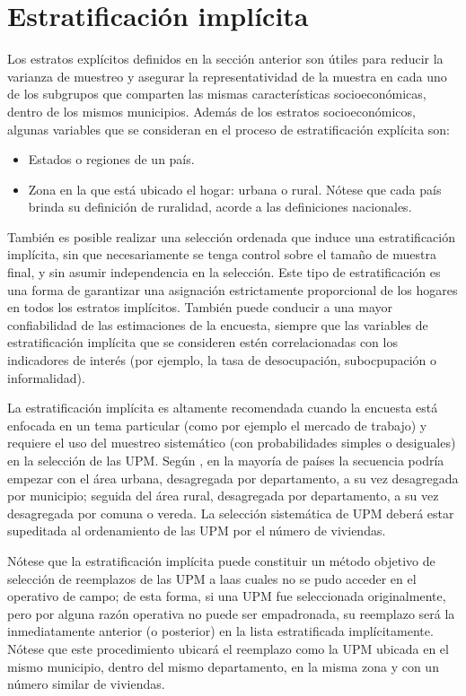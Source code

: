 \documentclass[
  10pt,
  spanish,
]{book}
\providecommand{\tightlist}{%
  \setlength{\itemsep}{0pt}\setlength{\parskip}{0pt}}
\begin{document}
\hypertarget{estratificaciuxf3n-impluxedcita}{%
\section{Estratificación implícita}\label{estratificaciuxf3n-impluxedcita}}

Los estratos explícitos definidos en la sección anterior son útiles para reducir la varianza de muestreo y asegurar la representatividad de la muestra en cada uno de los subgrupos que comparten las mismas características socioeconómicas, dentro de los mismos municipios. Además de los estratos socioeconómicos, algunas variables que se consideran en el proceso de estratificación explícita son:

\begin{itemize}
\tightlist
\item
  Estados o regiones de un país.
\item
  Zona en la que está ubicado el hogar: urbana o rural. Nótese que cada país brinda su definición de ruralidad, acorde a las definiciones nacionales.
\end{itemize}

También es posible realizar una selección ordenada que induce una estratificación implícita, sin que necesariamente se tenga control sobre el tamaño de muestra final, y sin asumir independencia en la selección. Este tipo de estratificación es una forma de garantizar una asignación estrictamente proporcional de los hogares en todos los estratos implícitos. También puede conducir a una mayor confiabilidad de las estimaciones de la encuesta, siempre que las variables de estratificación implícita que se consideren estén correlacionadas con los indicadores de interés (por ejemplo, la tasa de desocupación, subocpupación o informalidad).

La estratificación implícita es altamente recomendada cuando la encuesta está enfocada en un tema particular (como por ejemplo el mercado de trabajo) y requiere el uso del muestreo sistemático (con probabilidades simples o desiguales) en la selección de las UPM. Según \citet[pág. 46]{UN_2008}, en la mayoría de países la secuencia podría empezar con el área urbana, desagregada por departamento, a su vez desagregada por municipio; seguida del área rural, desagregada por departamento, a su vez desagregada por comuna o vereda. La selección sistemática de UPM deberá estar supeditada al ordenamiento de las UPM por el número de viviendas.

Nótese que la estratificación implícita puede constituir un método objetivo de selección de reemplazos de las UPM a laas cuales no se pudo acceder en el operativo de campo; de esta forma, si una UPM fue seleccionada originalmente, pero por alguna razón operativa no puede ser empadronada, su reemplazo será la inmediatamente anterior (o posterior) en la lista estratificada implícitamente. Nótese que este procedimiento ubicará el reemplazo como la UPM ubicada en el mismo municipio, dentro del mismo departamento, en la misma zona y con un número similar de viviendas.
\end{document}
